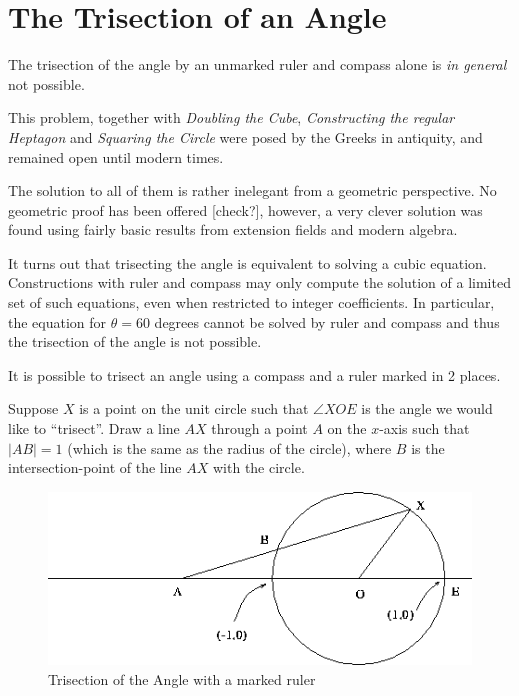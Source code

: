 \section{The Trisection of an Angle}

\begin{teo}
The trisection of the angle by an unmarked ruler and compass alone
is {\em in general} not possible.
\end{teo}


This problem, together with {\em Doubling the Cube}, {\em Constructing the
regular Heptagon} and {\em Squaring the Circle} were posed by the Greeks in
antiquity, and remained open until modern times.

The solution to all of them is rather inelegant from a geometric
perspective. No geometric proof has been offered [check?],
however, a very clever solution was found using fairly basic
results from extension fields and modern algebra.

It turns out that trisecting the angle is equivalent to solving
a cubic equation. Constructions with ruler and compass may
only compute the solution of a limited set of such equations,
even when restricted to integer coefficients. In particular,
the equation for $\theta = 60$ degrees cannot be solved by
ruler and compass and thus the trisection of the angle is not
possible.

It is possible to trisect an angle using a compass and a ruler marked
in 2 places.

Suppose $X$ is a point on the unit circle such that $\angle XOE$ is
the angle we would like to ``trisect''. Draw a line $AX$ through a
point $A$ on the $x$-axis such that $|AB| = 1$ (which is the same as
the radius of the circle), where $B$ is the intersection-point of the
line $AX$ with the circle.

\begin{figure}
\center
\includegraphics{figs/tri}
\caption{Trisection of the Angle with a marked ruler}
\end{figure}



